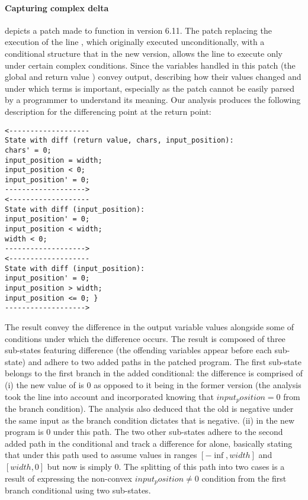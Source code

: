 \paragraph{Capturing complex delta}
 depicts a patch made to  function in version 6.11. The patch replacing the execution of the line , which originally executed unconditionally, with a conditional structure that in the new version, allows the line to execute only under certain complex conditions. Since the variables handled in this patch (the global  and return value ) convey output, describing how their values changed and under which terms is important, especially as the patch cannot be easily parsed by a programmer to understand its meaning. Our analysis produces the following description for the differencing point at the return point:
\begin{lstlisting}
<-------------------
State with diff (return value, chars, input_position):
chars' = 0;
input_position = width;
input_position < 0;
input_position' = 0;
------------------->
<-------------------
State with diff (input_position):
input_position' = 0;
input_position < width;
width < 0;
------------------->
<-------------------
State with diff (input_position):
input_position' = 0;
input_position > width;
input_position <= 0; }
------------------->
\end{lstlisting}
The result convey the difference in the output variable values alongside some of conditions under which the difference occurs. The result is composed of three sub-states featuring difference (the offending variables appear before each sub-state) and adhere to two added paths in the patched program. The first sub-state belongs to the first branch in the added conditional: the difference is comprised of (i) the new value of  is 0 as opposed to it being  in the former version (the analysis took the  line into account and incorporated knowing that $input_position = 0$ from the branch condition). The analysis also deduced that the old  is negative under the same input as the branch condition dictates that  is negative. (ii)  in the new program is 0 under this path. The two other sub-states adhere to the second added path in the conditional and track a difference for  alone, basically stating that  under this path used to assume values in ranges $[-\inf,width]$ and $[width,0]$ but now is simply 0. The splitting of this path into two cases is a result of expressing the non-convex $input_position \neq 0$ condition from the first branch conditional using two sub-states. 


